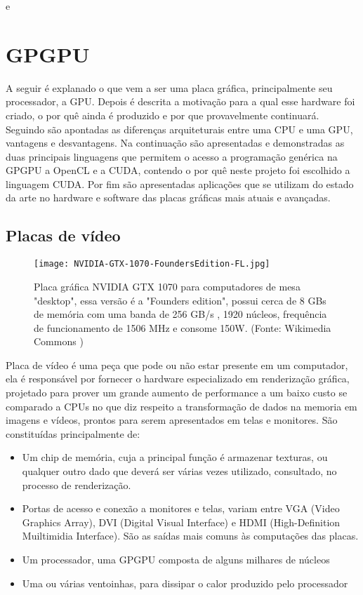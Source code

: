 e\chapter{GPGPU}
\label{cap:gpgpu}

A seguir é explanado o que vem a ser uma placa gráfica, principalmente seu processador, a GPU. Depois é descrita a motivação para a qual esse hardware foi criado, o por quê ainda é produzido e por que provavelmente continuará. Seguindo são apontadas as diferenças arquiteturais entre uma CPU e uma GPU, vantagens e desvantagens. Na continuação são apresentadas e demonstradas as duas principais linguagens que permitem o acesso a programação genérica na GPGPU a OpenCL e a CUDA, contendo o por quê neste projeto foi escolhido a linguagem CUDA. Por fim são apresentadas aplicações que se utilizam do estado da arte no hardware e software das placas gráficas mais atuais e avançadas.

\section{Placas de vídeo}
\label{sec:video_boards}
  \begin{figure}[!h]
    \centering
    \texttt{[image: NVIDIA-GTX-1070-FoundersEdition-FL.jpg]}
    \caption{Placa gráfica NVIDIA GTX 1070 para computadores de mesa "desktop", essa versão é a "Founders edition", possui cerca de 8 GBs de memória com uma banda de 256 GB/s , 1920 núcleos, frequência de funcionamento de 1506 MHz e consome 150W. (Fonte: Wikimedia Commons \protect\footnotemark)}
    \label{fig:gtx1070}
  \end{figure}


  Placa de vídeo é uma peça que pode ou não estar presente em um computador, ela é responsável por fornecer o hardware especializado em renderização gráfica, projetado para prover um grande aumento de performance a um baixo custo se comparado a CPUs no que diz respeito a transformação de dados na memoria em imagens e vídeos, prontos para serem apresentados em telas e monitores. São constituídas principalmente de:
  \begin{itemize}
    \item Um chip de memória, cuja a principal função é armazenar texturas, ou qualquer outro dado que deverá ser várias vezes utilizado, consultado, no processo de renderização.
    \item Portas de acesso e conexão a monitores e telas, variam entre VGA (Video Graphics Array), DVI (Digital Visual Interface) e HDMI (High-Definition Muiltimidia Interface). São as saídas mais comuns às computações das placas.
    \item Um processador, uma GPGPU composta de alguns milhares de núcleos
    \item Uma ou várias ventoinhas, para dissipar o calor produzido pelo processador
  \end{itemize}

